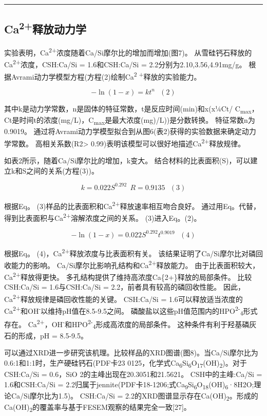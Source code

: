 \documentclass[11pt]{article}
\begin{document}
\noindent\rule{\textwidth}{0.5pt}
\subsection{Ca\textsuperscript{2+}释放动力学}
\label{sec:org3edc5bc}
实验表明，Ca\textsuperscript{2+}浓度随着Ca/Si摩尔比的增加而增加(图7)。 从雪硅钙石释放的
Ca\textsuperscript{2+}浓度，CSH:Ca/Si = 1.6和CSH:Ca/Si = 2.2分别为2.10,3.56,4.91mg/g。
根据Avrami动力学模型方程(方程(2)绘制Ca\textsuperscript{2 +}释放的实验能力。\cite{demirkıran07_dissol_kinet_ulexit_perch_acid_solut}

\[-\ln(1-x) = kt^{n} \ \ \ (2)\]

其中k是动力学常数，n是固体的特征常数，t是反应时间(min)和x(x¼Ct/ C\textsubscript{max}，Ct是时间t的浓度(mg/L)，C\textsubscript{max}是最大浓度(mg)/L))是分数转换。 特征常数n为0.9019。 通过将Avrami动力学模型拟合到从图6(表2)获得的实验数据来确定动力学常数。 高相关系数(R2> 0.99)表明该模型可以很好地描述Ca\textsuperscript{2+}释放规律。


如表2所示，随着Ca/Si摩尔比的增加，k变大。 结合材料的比表面积(S)，可以建立k和S之间的关系(方程(3))。

\[k = 0.022S^{0.292} \ \ R = 0.9135 \ \ \ (3)\]

根据Eq。 (3)样品的比表面积和Ca\textsuperscript{2+}释放速率相互吻合良好。 通过用Eq。代替，得到比表面积与Ca\textsuperscript{2+}溶解浓度之间的关系。 (3)进入Eq。(2)。

\[-\ln(1-x) = 0.022S^{0.292}t^{0.9019} \ \ \ (4)\]

根据Eq。 (4)，Ca\textsuperscript{2+}释放浓度与比表面积有关。 该结果证明了Ca/Si摩尔比对磷回收能力的影响。 Ca/Si摩尔比影响孔结构和Ca\textsuperscript{2+}释放能力。 由于比表面积较大，Ca\textsuperscript{2+}释放得更快。 多孔结构提供了维持高浓度Ca\{2+\}释放的局部条件。 比较CSH:Ca/Si = 1.6与CSH:Ca/Si = 2.2，前者具有较高的磷回收性能。 因此，Ca\textsuperscript{2+}释放规律是磷回收性能的关键。 CSH:Ca/Si = 1.6可以释放适当浓度的Ca\textsuperscript{2+}和OH\textsuperscript{-}以维持pH值在8.5-9.5之间。 磷酸盐以这些pH值范围内的HPO\textsuperscript{2-}\textsubscript{4}形式存在。\cite{liu12_remov_high_concen_phosp_by_calcit} Ca\textsuperscript{2+}，OH\textsuperscript{-}和HPO\textsuperscript{2-}\textsubscript{4}形成高浓度的局部条件。 这种条件有利于羟基磷灰石的形成，pH = 8.5-9.5。


可以通过XRD进一步研究该机理。比较样品的XRD图谱(图8)。当Ca/Si摩尔比为0.6:1和1:1时，生产硬硅钙石(PDF卡23 0125，化学式Ca\textsubscript{6}Si\textsubscript{6}O\textsubscript{17}(OH)\textsubscript{2})。对于CSH:Ca/Si = 0.6，SiO 2的主峰出现在20.3051和21.5621。 CSH中的主峰:Ca/Si = 1.6和CSH:Ca/Si = 2.2归属于jennite(PDF卡18-1206;式Ca\textsubscript{9}Si\textsubscript{6}O\textsubscript{18}(OH)\textsubscript{6}·8H2O;理论Ca/Si摩尔比为1.5)。 CSH:Ca/Si = 2.2的XRD图谱显示存在Ca(OH)\textsubscript{2}。形成的Ca(OH)\textsubscript{2}的覆盖率与基于FESEM观察的结果完全一致[27]。
\end{document}
